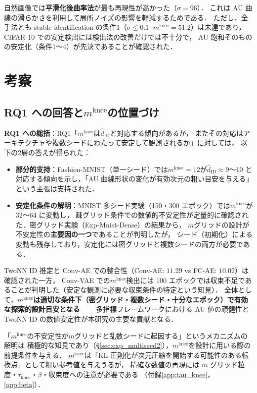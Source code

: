 \documentclass[11pt,a4paper]{jsarticle}
\newcommand{\mknee}{m^{\mathrm{knee}}}
\begin{document}
自然画像では\textbf{平滑化後曲率法}が最も再現性が高かった（$\sigma=96$）．
これは AU 曲線の滑らかさを利用して局所ノイズの影響を軽減するためである．
ただし，全手法とも stable identification の条件1（$\sigma \leq 0.1 \cdot \mknee = 51.2$）は未達であり，
CIFAR-10 での安定検出には検出法の改善だけでは不十分で，
AU 飽和そのものの安定化（条件1〜4）が先決であることが確認された．

\section{考察}\label{sec:discussion}

\subsection{RQ1 への回答と$\mknee$の位置づけ}\label{sec:disc_mknee}

\textbf{RQ1 への総括}：RQ1「$\mknee$は$\hat{d}_\mathrm{ID}$と対応する傾向があるか，
またその対応はアーキテクチャや複数シードにわたって安定して観測されるか」に対しては，
以下の2層の答えが得られた：

\begin{itemize}
  \item \textbf{部分的支持}：Fashion-MNIST（単一シード）では$\mknee = 12$が$\hat{d}_\mathrm{ID} \approx 9$〜10
        と対応する傾向を示し，「AU 曲線形状の変化が有効次元の粗い目安を与える」という主張は支持された．
  \item \textbf{安定化条件の解明}：MNIST 多シード実験（150・300 エポック）では$\mknee$が 32〜64 に変動し，
        疎グリッド条件での数値的不安定性が定量的に確認された．密グリッド実験（Exp-Mnist-Dense）の結果から，
        $m$グリッドの設計が不安定性の\textbf{主要因の一つ}であることが判明したが，
        シード（初期化）による変動も残存しており，安定化には密グリッドと複数シードの両方が必要である．
\end{itemize}

TwoNN ID 推定と Conv-AE での整合性（Conv-AE: $11.29$ vs FC-AE: $10.02$）は確認された一方，
Conv-VAE での$\mknee$検出には 100 エポックでは収束不足であることが判明した（安定な観測に必要な収束条件の特定という知見）．
全体として，\textbf{$\mknee$は適切な条件下（密グリッド・複数シード・十分なエポック）で有効な探索的設計目安となる}——
多指標フレームワークにおける AU 値の頑健性と TwoNN ID の数値安定性が本研究の主要な貢献となる．

「$\mknee$の不安定性が$m$グリッドと乱数シードに起因する」というメカニズムの解明は
積極的な知見であり（§\ref{sec:exp_multiseed2}），$\mknee$を設計に用いる際の前提条件を与える．
$\mknee$は「KL 正則化が次元圧縮を開始する可能性のある転換点」として粗い参考値を与えうるが，
精確な数値の再現には $m$ グリッド粒度・$\tau_\mathrm{knee}$・$\beta$・収束度への注意が必要である
（付録\ref{app:tau_knee}，\ref{app:beta}）．
\end{document}
